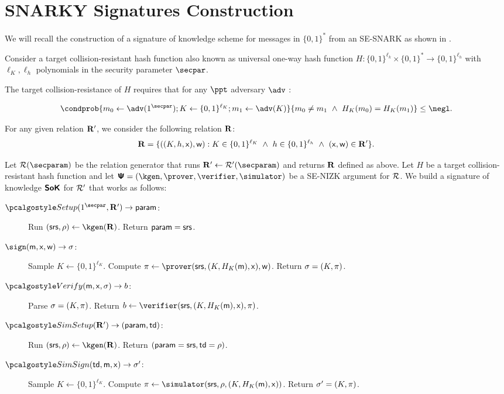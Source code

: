 \section{SNARKY Signatures Construction}\label{sec:SoKconstruction}

We will recall the construction of 
a signature of knowledge scheme for messages in $\{0, 1\}^*$
from an SE-SNARK as shown in \cite{C:GroMal17}. 
 
Consider a target collision-resistant hash function also known as universal one-way hash function $H:\{0, 1\}^{\ell_k} \times \{0, 1\}^* \to \{0, 1\}^{\ell_h}$ with $\ell_K, \ell_h$ polynomials in the security parameter $\secpar$. 

The target collision-resistance of $H$ requires that for any $\ppt$ adversary $\adv$ : 
 
	\[  \condprob{
	m_0 \gets \adv(1^\secpar); K \gets \{0, 1\}^{\ell_K}; m_1 \gets \adv(K)
}{
	m_0 \neq m_1 ~\land  ~H_K(m_0)=H_K(m_1)
} \leq \negl.
	\]
	
For any given relation $\mathbf{R}'$, we consider the  following relation $\mathbf{R}$:
 	\[\mathbf{R}= \{((K,h,\mathsf{x}),\mathsf{w}) : K\in  \{0, 1\}^{\ell_K} ~\land ~h \in  \{0, 1\}^{\ell_h} ~\land ~(\mathsf{x}, \mathsf{w}) \in \mathbf{R}'\}.
 	\]
 	
Let $\RELGEN(\secparam)$ be the relation generator that runs $\REL' \gets \RELGEN'(\secparam)$ and returns $\mathbf{R}$ defined as above. 
Let $H$ be a target collision-resistant hash function and let $\ps = (\kgen, \prover, \verifier, \simulator)$ be a SE-NIZK argument for $\mathcal{R}$. 
We build a signature of knowledge  $\bm{\mathsf{SoK}}$ for $\mathcal{R}'$ that works as follows: 

\begin{description}
    \item[$\signsetup(1^\secpar, \REL') \rightarrow  \param$:]
 Run $(\srs,\rho) \leftarrow \kgen(\REL)$. 
 Return $ \mathsf{param} = \mathsf{srs}$.

    \item[$\sign(\mesage, \inp, \wit)  \rightarrow \signature$:]
Sample $K \gets \{0, 1\}^{\ell_K}$.  Compute
$\zkproof \gets  \prover(\srs, (K, H_K(\mesage), \inp), \wit) $.
Return $\mathsf{\sigma} = (K, \pi)$.

    \item[$\verify(\mesage, \inp, \signature) \rightarrow b$:]
Parse $\mathsf{\sigma} = (K, \pi)$.
Return $b \gets \verifier(\srs, (K, H_K(\mesage), \inp), \zkproof)$.
	
    \item[$\simsetup(\REL') \rightarrow (\param, \td)$:]
  Run   $(\srs,\rho) \leftarrow \kgen(\REL)$. 
 Return $( \mathsf{param} = \mathsf{srs},  \mathsf{td} = \rho)$.

    	
   \item[$\simsign(\td, \mesage, \inp) \rightarrow \signature'$:]
   Sample $K \gets \{0, 1\}^{\ell_K}$.  Compute
$\zkproof \gets \simulator(\srs, \rho, (K, H_K(\mesage), \inp)) $.
Return $\mathsf{\sigma}' = (K, \pi)$.

\end{description} 


